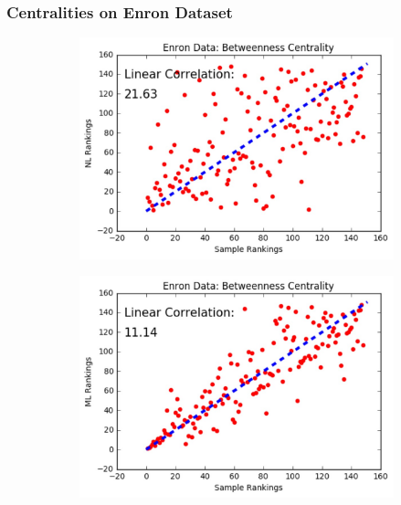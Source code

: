 \documentclass[9pt]{beamer}
\begin{document}
\begin{frame}
\frametitle{Centralities on Enron Dataset}
\vspace{0.15in}
\begin{figure}[H]
\centering
\begin{subfigure}{.32\textwidth}
  \centering
  \includegraphics[width=0.95\linewidth]{EBC_NL.jpeg}
\end{subfigure}
\begin{subfigure}{.32\textwidth}
	\centering
    \includegraphics[width=0.95\linewidth]{EBC_ML.jpeg}
\end{subfigure}
\begin{subfigure}{.32\textwidth}
	\centering

\end{subfigure}
\end{figure}
\end{frame}
\end{document}

